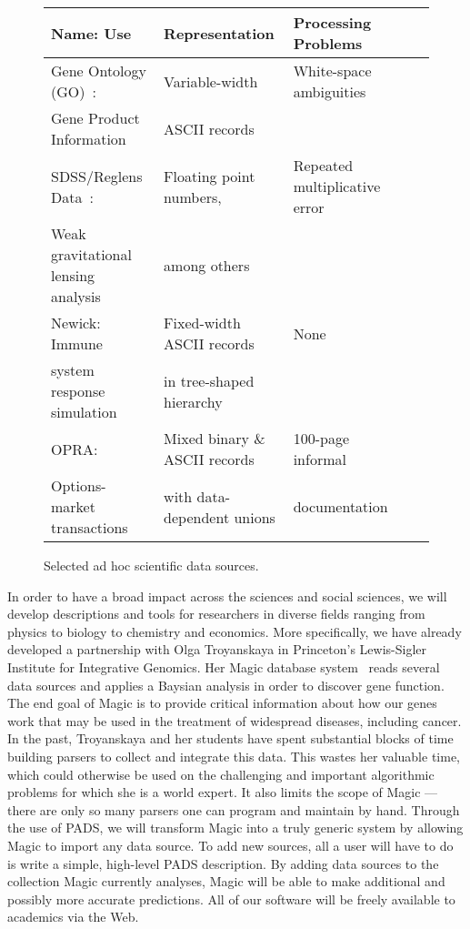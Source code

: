 \documentclass[11pt]{article}
\begin{document}
\begin{figure*}
\begin{center}
\begin{tabular}{@{}|l|l|l|l|l|}
\hline
Name: Use                           & Representation    & Processing Problems \\ \hline\hline
Gene Ontology (GO)~\cite{geneontology}:                  & Variable-width    & White-space ambiguities \\
Gene Product Information 	      & ASCII records &  \\ \hline
SDSS/Reglens Data~\cite{mandelbaum+:reglens}:                & Floating point numbers, & Repeated multiplicative error \\
Weak gravitational lensing analysis   & among others & \\ \hline
Newick:   Immune                    & Fixed-width ASCII records & None \\ 
system response simulation          & in tree-shaped hierarchy &\\ \hline                                
OPRA:                               & Mixed binary \& ASCII records 
                                                       & 100-page informal \\
Options-market transactions         & with data-dependent unions & documentation \\ \hline
\end{tabular}
\caption{Selected ad hoc scientific data sources.}
\label{figure:scientific-data-sources}
\end{center}
\end{figure*}


In order to have a broad impact across the sciences and social sciences,
we will develop descriptions and tools for researchers in diverse fields ranging from
physics to biology to chemistry and economics.
More specifically, we have already developed a partnership with
Olga Troyanskaya in Princeton's Lewis-Sigler Institute for 
Integrative Genomics.  Her Magic database system~\cite{magic}
reads several data sources
and applies a Baysian analysis in order to discover gene function.
The end goal of Magic is to provide critical information about how
our genes work that may be used in the treatment of widespread diseases,
including cancer.
In the past, Troyanskaya and her students have spent
substantial blocks of time building parsers to collect and integrate
this data.  This wastes her valuable time, which could otherwise be
used on the challenging and important algorithmic problems for which
she is a world expert.  It also limits the scope of Magic --- there are
only so many parsers one can program and maintain by hand.
Through the use of PADS, we will transform Magic into a truly generic
system by allowing Magic to import any data source.  To add new sources,
all a user will have to do is write a simple, high-level PADS description.
By adding data sources to the collection Magic
currently analyses, Magic will be able to make additional and possibly more
accurate predictions.  All of our software will
be freely available to academics via the Web.
\end{document}
